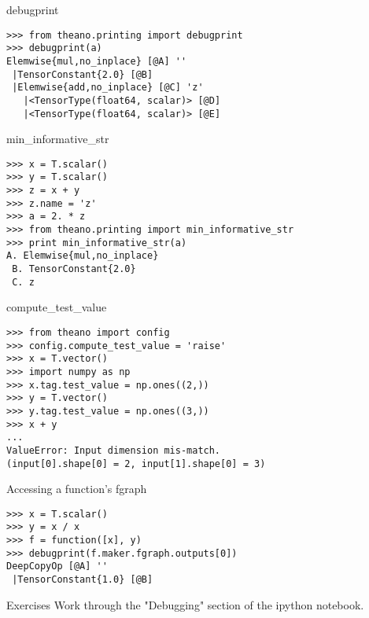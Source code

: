 \documentclass[utf8x,hyperref={pdfpagelabels=false}]{beamer}
\begin{document}
\begin{frame}[fragile]{debugprint}
\begin{lstlisting}
>>> from theano.printing import debugprint
>>> debugprint(a)
Elemwise{mul,no_inplace} [@A] ''
 |TensorConstant{2.0} [@B]
 |Elemwise{add,no_inplace} [@C] 'z'
   |<TensorType(float64, scalar)> [@D]
   |<TensorType(float64, scalar)> [@E]
\end{lstlisting}
\end{frame}

\begin{frame}[fragile]{min\_informative\_str}
\begin{lstlisting}
>>> x = T.scalar()
>>> y = T.scalar()
>>> z = x + y
>>> z.name = 'z'
>>> a = 2. * z
>>> from theano.printing import min_informative_str
>>> print min_informative_str(a)
A. Elemwise{mul,no_inplace}
 B. TensorConstant{2.0}
 C. z
\end{lstlisting}
\end{frame}

\begin{frame}[fragile]{compute\_test\_value}
\begin{lstlisting}
>>> from theano import config
>>> config.compute_test_value = 'raise'
>>> x = T.vector()
>>> import numpy as np
>>> x.tag.test_value = np.ones((2,))
>>> y = T.vector()
>>> y.tag.test_value = np.ones((3,))
>>> x + y
...
ValueError: Input dimension mis-match.
(input[0].shape[0] = 2, input[1].shape[0] = 3)
\end{lstlisting}
\end{frame}

\begin{frame}[fragile]{Accessing a function’s fgraph}
\begin{lstlisting}
>>> x = T.scalar()
>>> y = x / x
>>> f = function([x], y)
>>> debugprint(f.maker.fgraph.outputs[0])
DeepCopyOp [@A] ''
 |TensorConstant{1.0} [@B]
\end{lstlisting}
\end{frame}

\begin{frame}{Exercises}
Work through the "Debugging" section of the ipython notebook.
\end{frame}
\end{document}
